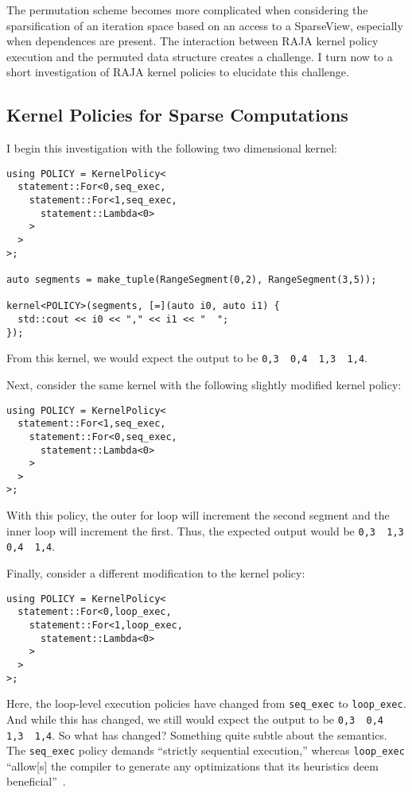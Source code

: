 The permutation scheme becomes more complicated when considering the sparsification of an iteration space based on an access to a SparseView, especially when dependences are present. 
The interaction between RAJA kernel policy execution and the permuted data structure creates a challenge. 
I turn now to a short investigation of RAJA kernel policies to elucidate this challenge.

\subsection{Kernel Policies for Sparse Computations}

I begin this investigation with the following two dimensional kernel:
\begin{lstlisting}
using POLICY = KernelPolicy<
  statement::For<0,seq_exec,
    statement::For<1,seq_exec,
      statement::Lambda<0>
    >
  >
>;

auto segments = make_tuple(RangeSegment(0,2), RangeSegment(3,5));

kernel<POLICY>(segments, [=](auto i0, auto i1) {
  std::cout << i0 << "," << i1 << "  ";
});
\end{lstlisting}
From this kernel, we would expect the output to be \verb.0,3  0,4  1,3  1,4..

Next, consider the same kernel with the following slightly modified kernel policy:
\begin{lstlisting}
using POLICY = KernelPolicy<
  statement::For<1,seq_exec,
    statement::For<0,seq_exec,
      statement::Lambda<0>
    >
  >
>;
\end{lstlisting}
With this policy, the outer for loop will increment the second segment and the inner loop will increment the first.
Thus, the expected output would be \verb.0,3  1,3  0,4  1,4..

Finally, consider a different modification to the kernel policy:
\begin{lstlisting}
using POLICY = KernelPolicy<
  statement::For<0,loop_exec,
    statement::For<1,loop_exec,
      statement::Lambda<0>
    >
  >
>;
\end{lstlisting}
Here, the loop-level execution policies have changed from \verb.seq_exec. to \verb.loop_exec..
And while this has changed, we still would expect the output to be \verb.0,3  0,4  1,3  1,4..
So what has changed? 
Something quite subtle about the semantics. 
The \verb.seq_exec. policy demands \enquote{strictly sequential execution,} whereas \verb.loop_exec. \enquote{allow[s] the compiler to generate any optimizations that its heuristics deem beneficial}~\cite{rajadocs}.

